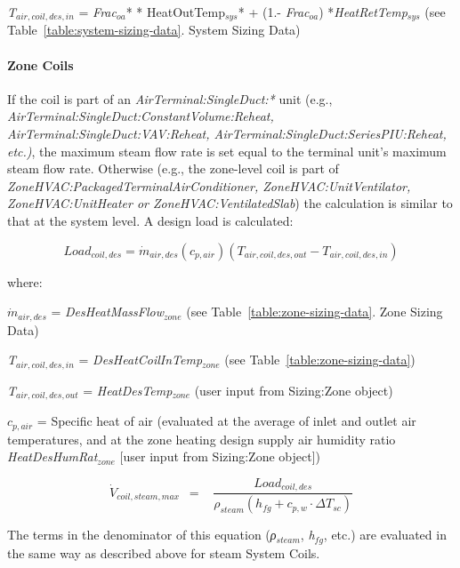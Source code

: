 \emph{T\(_{air,coil,des,in}\)} = \emph{Frac}\(_{oa}\)* * HeatOutTemp\(_{sys}\)* + (1.- \emph{Frac\(_{oa}\)}) *\emph{HeatRetTemp\(_{sys}\)} (see Table~\ref{table:system-sizing-data}. System Sizing Data)

\paragraph{Zone Coils}\label{zone-coils-2}

If the coil is part of an \emph{AirTerminal:SingleDuct:*} unit (e.g., \emph{Air\-Terminal:\-Single\-Duct:\-Constant\-Volume\-:Re\-heat, Air\-Terminal:\-Single\-Duct:\-VAV:\-Re\-heat, Air\-Terminal:\-Single\-Duct:\-Series\-PIU:\-Re\-heat, etc.)}, the maximum steam flow rate is set equal to the terminal unit's maximum steam flow rate. Otherwise (e.g., the zone-level coil is part of \emph{Zone\-HVAC:\-Packaged\-Terminal\-Air\-Conditioner, Zone\-HVAC\-:Unit\-Ventilator, Zone\-HVAC\-:Unit\-Heater or Zone\-HVAC:\-Ventilated\-Slab}) the calculation is similar to that at the system level. A design load is calculated:

\begin{equation}
Loa{d_{coil,des}} = {\dot m_{air,des}}({c_{p,air}})({T_{air,coil,des,out}} - {T_{air,coil,des,in}})
\end{equation}

where:

\({\dot m_{air,des}}\) = \emph{DesHeatMassFlow\(_{zone}\)} (see Table~\ref{table:zone-sizing-data}. Zone Sizing Data)

\emph{T\(_{air,coil,des,in}\)} = \emph{DesHeatCoilInTemp\(_{zone}\)} (see Table~\ref{table:zone-sizing-data})

\emph{T\(_{air,coil,des,out}\)} = \emph{HeatDesTemp\(_{zone}\)} (user input from Sizing:Zone object)

\({c_{p,air}}\) = Specific heat of air (evaluated at the average of inlet and outlet air temperatures, and at the zone heating design supply air humidity ratio \emph{HeatDesHumRat\(_{zone}\)} {[}user input from Sizing:Zone object{]})

\begin{equation}
{\dot V_{coil,steam,max}}\,\,\, = \,\,\,\,\,\frac{{Loa{d_{coil,des}}}}{{{\rho_{steam}}\left( {{h_{fg}} + {c_{p,w}}\cdot \Delta {T_{sc}}} \right)}}
\end{equation}

The terms in the denominator of this equation (\emph{ρ\(_{steam}\)}, \emph{h\(_{fg}\)}, etc.) are evaluated in the same way as described above for steam System Coils.

